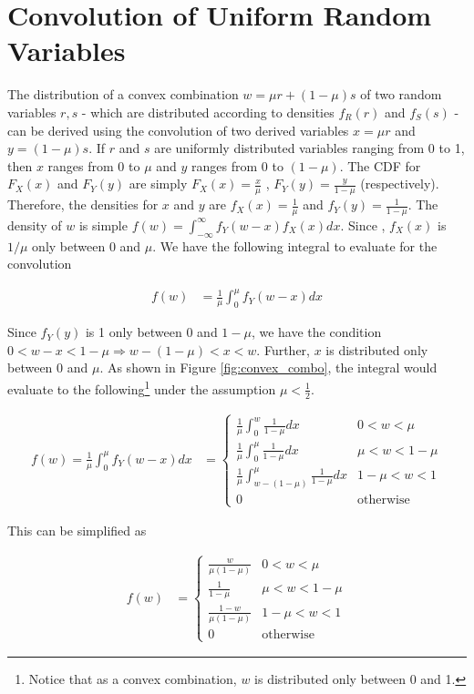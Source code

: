 \documentclass[
    oneside,
    fontsize=10pt,leqno]{article}
\begin{document}
\appendix
\section{Convolution of Uniform Random Variables} \label{sec:appendix_theoretical_1}

The distribution of a convex combination $w=\mu r+(1-\mu)s$ of two
random variables $r,s$ - which are distributed according to densities
$f_{R}(r)$ and $f_{S}(s)$ - can be derived using the convolution
of two derived variables $x=\mu r$ and $y=(1-\mu)s$. If $r$ and
$s$ are uniformly distributed variables ranging from 0 to 1, then
$x$ ranges from 0 to $\mu$ and $y$ ranges from $0$ to $(1-\mu)$.
The CDF for $F_{X}(x)$ and $F_{Y}(y)$ are simply $F_{X}(x)=\frac{x}{\mu}$
, $F_{Y}(y)=\frac{y}{1-\mu}$ (respectively). Therefore, the densities
for $x$ and $y$ are $f_{X}(x)=\frac{1}{\mu}$ and $f_{Y}(y)=\frac{1}{1-\mu}$.
The density of $w$ is simple $f(w)=\int_{-\infty}^{\infty}f_{Y}(w-x)f_{X}(x)dx$.
Since , $f_{X}(x)$ is $1/\mu$ only between $0$ and $\mu$. We have
the following integral to evaluate for the convolution

\begin{align*}
f(w) & =\frac{1}{\mu}\int_{0}^{\mu}f_{Y}(w-x)dx
\end{align*}

Since $f_{Y}(y)$ is 1 only between 0 and $1-\mu$, we have the condition
$0<w-x<1-\mu\Rightarrow w-(1-\mu)<x<w$. Further, $x$ is distributed
only between 0 and $\mu$. As shown in Figure \ref{fig:convex_combo},
the integral would evaluate to the following\footnote{Notice that as a convex combination, $w$ is distributed only between
0 and 1.} under the assumption $\mu<\frac{1}{2}$.

\begin{align*}
f(w)=\frac{1}{\mu}\int_{0}^{\mu}f_{Y}(w-x)dx & =\begin{cases}
\frac{1}{\mu}\int_{0}^{w}\frac{1}{1-\mu}dx & 0<w<\mu\\
\frac{1}{\mu}\int_{0}^{\mu}\frac{1}{1-\mu}dx & \mu<w<1-\mu\\
\frac{1}{\mu}\int_{w-(1-\mu)}^{\mu}\frac{1}{1-\mu}dx & 1-\mu<w<1\\
0 & \text{otherwise}
\end{cases}
\end{align*}

This can be simplified as 

\begin{align*}
f(w) & =\begin{cases}
\frac{w}{\mu(1-\mu)} & 0<w<\mu\\
\frac{1}{1-\mu} & \mu<w<1-\mu\\
\frac{1-w}{\mu(1-\mu)} & 1-\mu<w<1\\
0 & \text{otherwise}
\end{cases}
\end{align*}
\end{document}

